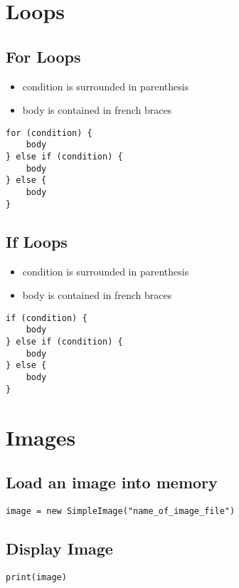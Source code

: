 \documentclass{article}
\begin{document}
\section{Loops}

\subsection{For Loops}
\begin{itemize}
  \item condition is surrounded in parenthesis
  \item body is contained in french braces
\end{itemize}
\begin{lstlisting}
for (condition) {
    body
} else if (condition) {
    body
} else {
    body
}
\end{lstlisting}

\subsection{If Loops}
\begin{itemize}
  \item condition is surrounded in parenthesis
  \item body is contained in french braces
\end{itemize}
\begin{lstlisting}
if (condition) {
    body
} else if (condition) {
    body
} else {
    body
}
\end{lstlisting}

\section{Images}

\subsection{Load an image into memory}
\begin{lstlisting}
image = new SimpleImage("name_of_image_file")
\end{lstlisting}

\subsection{Display Image}
\begin{lstlisting}
print(image)
\end{lstlisting}
\end{document}
